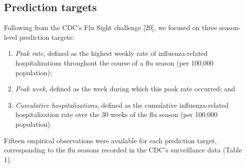 \documentclass[10pt,letterpaper]{article}
\providecommand{\tightlist}{%
  \setlength{\itemsep}{0pt}\setlength{\parskip}{0pt}}
\begin{document}
\hypertarget{prediction-targets}{%
\subsection{Prediction targets}\label{prediction-targets}}

Following from the CDC's Flu Sight challenge {[}20{]}, we focused on
three season-level prediction targets:

\begin{enumerate}
\def\labelenumi{\arabic{enumi}.}
\tightlist
\item
  \emph{Peak rate}, defined as the highest weekly rate of
  influenza-related hospitalizations throughout the course of a flu
  season (per 100,000 population);
\item
  \emph{Peak week}, defined as the week during which this peak rate
  occurred; and
\item
  \emph{Cumulative hospitalizations}, defined as the cumulative
  influenza-related hospitalization rate over the 30 weeks of the flu
  season (per 100,000 population).
\end{enumerate}

Fifteen empirical observations were available for each prediction
target, corresponding to the flu seasons recorded in the CDC's
surveillance data (Table 1).
\end{document}
